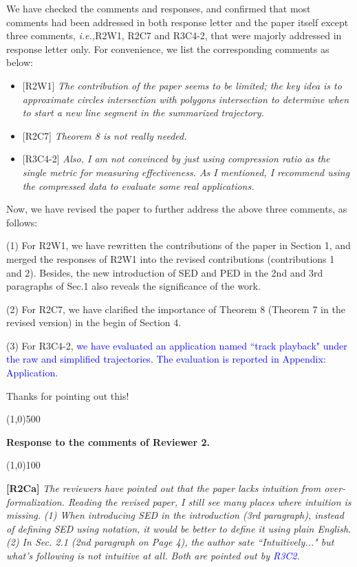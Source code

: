 \documentclass{letter}
\newcommand{\ie}{\emph{i.e.,}\xspace}
\begin{document}
We have checked the comments and responses, and confirmed that most comments had been addressed in both response letter and the paper itself except three comments, \ie {R2W1}, {R2C7} and {R3C4-2}, that were majorly addressed in response letter only. For convenience, we list the corresponding comments as below:
\begin{itemize}
  \item {{[R2W1]} \emph{The contribution of the paper seems to be limited; the key idea is to approximate circles intersection with polygons intersection to determine when to start a new line segment in the summarized trajectory.}}
  \item {{[R2C7]} \emph{Theorem 8 is not really needed.}}
  \item {{[R3C4-2]} \emph{Also, I am not convinced by just using compression ratio as the single metric for measuring effectiveness. As I mentioned, I recommend using the compressed data to evaluate some real applications.}
}
\end{itemize}

Now, we have revised the paper to further address the above three comments, as follows:

(1) For {R2W1}, we have rewritten the contributions of the paper in Section 1, and merged the responses of {R2W1} into the revised contributions (contributions 1 and 2). Besides, the new introduction of SED and PED in the 2nd and 3rd paragraphs of Sec.1 also reveals the significance of the work.

(2) For {R2C7}, we have clarified the importance of Theorem 8 (Theorem 7 in the revised version) in the begin of Section 4.

(3) For {R3C4-2}, \textcolor{blue}{we have evaluated an application named ``track playback" under the raw and simplified trajectories. The evaluation is reported in Appendix: Application.}

Thanks for pointing out this!





\line(1,0){500}

\textbf{Response to the comments of Reviewer 2.}

\line(1,0){100}


\textbf{[R2Ca]} \emph{The reviewers have pointed out that the paper lacks intuition from over-formalization. Reading the revised paper, I still see many places where intuition is missing.}
\emph{(1) When introducing SED in the introduction (3rd paragraph), instead of defining SED using notation, it would be better to define it using plain English.}
\emph{(2) In Sec. 2.1 (2nd paragraph on Page 4), the author sate ``Intuitively..." but what's following is not intuitive at all.}
\emph{Both are pointed out by \textcolor{blue}{R3C2}.}
\end{document}
